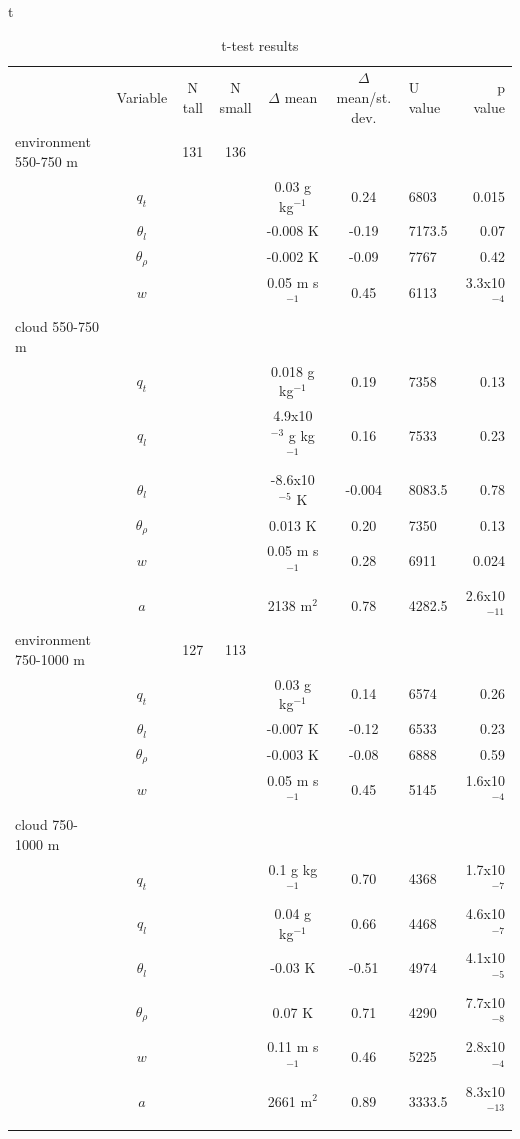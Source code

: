 \documentclass[acp]{copernicus}
\begin{document}
t
\begin{table}[t]
\label{tbl:mannwhitneyu}
\caption{t-test results}
\vskip4mm
\centering
\begin{tabular}{lccccclr}
\tophline
& Variable & N tall & N small & $\Delta$ mean & $\Delta$ mean/st. dev. & U value & p value\\
\middlehline
environment 550-750 m & & 131 & 136 & & & & \\
& $q_t$       & & &  0.03 g kg$^{-1}$          &  0.24 & 6803   & 0.015    \\ 
& $\theta_l$ & & & -0.008 K                   & -0.19 & 7173.5 & 0.07    \\
& $\theta_\rho$ & & & -0.002 K                   & -0.09 & 7767   & 0.42    \\
& $w$         & & &  0.05 m s$^{-1}$           &  0.45 & 6113   & 3.3x10$^{-4}$ \\
cloud 550-750 m & & & & & & \\
& $q_t$       & & &  0.018 g kg$^{-1}$         &  0.19 & 7358   & 0.13   \\
& $q_l$       & & &  4.9x10$^{-3}$ g kg$^{-1}$ &  0.16 & 7533   & 0.23   \\
& $\theta_l$ & & & -8.6x10$^{-5}$ K           & -0.004 & 8083.5 & 0.78 \\
& $\theta_\rho$ & & &  0.013 K                   &  0.20 & 7350   & 0.13  \\
& $w$         & & &  0.05 m s$^{-1}$           &  0.28 & 6911   & 0.024  \\
& $a$         & & &  2138 m$^2$                &  0.78 & 4282.5 & 2.6x10$^{-11}$ \\
environment 750-1000 m & & 127 & 113 & & & & \\
& $q_t$       & & &  0.03 g kg$^{-1}$          &  0.14 & 6574 & 0.26    \\
& $\theta_l$ & & & -0.007 K                   & -0.12 & 6533 & 0.23    \\
& $\theta_\rho$ & & & -0.003 K                   & -0.08 & 6888 & 0.59    \\
& $w$         & & &  0.05 m s$^{-1}$           &  0.45 & 5145 & 1.6x10$^{-4}$ \\
cloud 750-1000 m & & & & & &          \\
& $q_t$       & & &  0.1 g kg$^{-1}$           &  0.70 & 4368   & 1.7x10$^{-7}$ \\
& $q_l$       & & &  0.04 g kg$^{-1}$          &  0.66 & 4468   & 4.6x10$^{-7}$ \\
& $\theta_l$ & & & -0.03 K                    & -0.51 & 4974   & 4.1x10$^{-5}$  \\
& $\theta_\rho$ & & &  0.07 K                    &  0.71 & 4290   & 7.7x10$^{-8}$ \\
& $w$         & & &  0.11 m s$^{-1}$           &  0.46 & 5225   & 2.8x10$^{-4}$  \\
& $a$         & & &  2661 m$^2$                &  0.89 & 3333.5 & 8.3x10$^{-13}$ \\

\bottomhline
\end{tabular}
\end{table}
\end{document}
